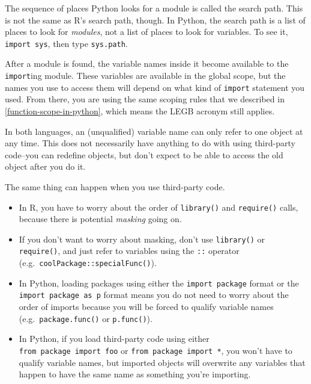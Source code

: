 \documentclass[12pt,krantz2]{krantz}
\providecommand{\tightlist}{%
  \setlength{\itemsep}{0pt}\setlength{\parskip}{0pt}}
\begin{document}
The sequence of places Python looks for a module is called the search path. This is not the same as R's search path, though. In Python, the search path is a list of places to look for \emph{modules}, not a list of places to look for variables. To see it, \texttt{import\ sys}, then type \texttt{sys.path}.

After a module is found, the variable names inside it become available to the \texttt{import}ing module. These variables are available in the global scope, but the names you use to access them will depend on what kind of \texttt{import} statement you used. From there, you are using the same scoping rules that we described in \ref{function-scope-in-python}, which means the LEGB acronym still applies.

\begin{rmd-details}

In both languages, an (unqualified) variable name can only refer to one object at any time. This does not necessarily have anything to do with using third-party code--you can redefine objects, but don't expect to be able to access the old object after you do it.

The same thing can happen when you use third-party code.

\begin{itemize}
\tightlist
\item
  In R, you have to worry about the order of \texttt{library()} and \texttt{require()} calls, because there is potential \emph{masking} going on.
\item
  If you don't want to worry about masking, don't use \texttt{library()} or \texttt{require()}, and just refer to variables using the \texttt{::} operator (e.g.~\texttt{coolPackage::specialFunc()}).
\item
  In Python, loading packages using either the \texttt{import\ package} format or the \texttt{import\ package\ as\ p} format means you do not need to worry about the order of imports because you will be forced to qualify variable names (e.g.~\texttt{package.func()} or \texttt{p.func()}).
\item
  In Python, if you load third-party code using either \texttt{from\ package\ import\ foo} or \texttt{from\ package\ import\ *}, you won't have to qualify variable names, but imported objects will overwrite any variables that happen to have the same name as something you're importing.
\end{itemize}


\end{rmd-details}
\end{document}
